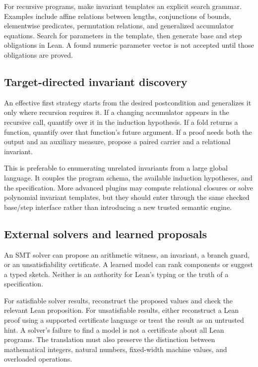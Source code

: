 \documentclass[11pt,letterpaper]{article}
\theoremstyle{definition}
\theoremstyle{remark}
\begin{document}
For recursive programs, make invariant templates an explicit search grammar. Examples include affine relations between lengths, conjunctions of bounds, elementwise predicates, permutation relations, and generalized accumulator equations. Search for parameters in the template, then generate base and step obligations in Lean. A found numeric parameter vector is not accepted until those obligations are proved.

\subsection{Target-directed invariant discovery}

An effective first strategy starts from the desired postcondition and generalizes it only where recursion requires it. If a changing accumulator appears in the recursive call, quantify over it in the induction hypothesis. If a fold returns a function, quantify over that function's future argument. If a proof needs both the output and an auxiliary measure, propose a paired carrier and a relational invariant.

This is preferable to enumerating unrelated invariants from a large global language. It couples the program schema, the available induction hypotheses, and the specification. More advanced plugins may compute relational closures or solve polynomial invariant templates, but they should enter through the same checked base/step interface rather than introducing a new trusted semantic engine.

\subsection{External solvers and learned proposals}

An SMT solver can propose an arithmetic witness, an invariant, a branch guard, or an unsatisfiability certificate. A learned model can rank components or suggest a typed sketch. Neither is an authority for Lean's typing or the truth of a specification.

For satisfiable solver results, reconstruct the proposed values and check the relevant Lean proposition. For unsatisfiable results, either reconstruct a Lean proof using a supported certificate language or treat the result as an untrusted hint. A solver's failure to find a model is not a certificate about all Lean programs. The translation must also preserve the distinction between mathematical integers, natural numbers, fixed-width machine values, and overloaded operations.
\end{document}
